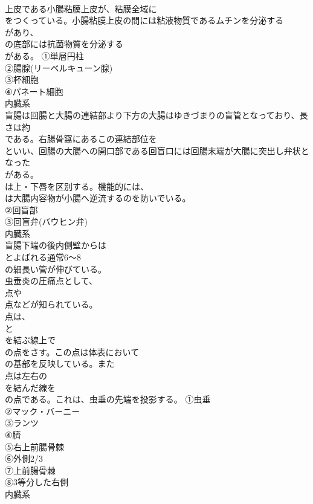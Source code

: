 \documentclass[8pt]{extreport}
\begin{document}
\begin{CJK}{UTF8}{min}
\\	上皮である小腸粘膜上皮が、粘膜全域に
\\	をつくっている。小腸粘膜上皮の間には粘液物質であるムチンを分泌する
\\	があり、
\\	の底部には抗菌物質を分泌する
\\	がある。	①単層円柱
\\	②腸腺(リーベルキューン腺)
\\	③杯細胞
\\	④パネート細胞
\\	内臓系
\\	盲腸は回腸と大腸の連結部より下方の大腸はゆきづまりの盲管となっており、長さは約
\\	である。右腸骨窩にあるこの連結部位を
\\	といい、回腸の大腸への開口部である回盲口には回腸末端が大腸に突出し弁状となった
\\	がある。
\\	は上・下唇を区別する。機能的には、
\\	は大腸内容物が小腸へ逆流するのを防いでいる。	
\\	②回盲部
\\	③回盲弁(バウヒン弁)
\\	内臓系
\\	盲腸下端の後内側壁からは
\\	とよばれる通常6～8
\\	の細長い管が伸びている。
\\	虫垂炎の圧痛点として、
\\	点や
\\	点などが知られている。
\\	点は、
\\	と
\\	を結ぶ線上で
\\	の点をさす。この点は体表において
\\	の基部を反映している。また
\\	点は左右の
\\	を結んだ線を
\\	の点である。これは、虫垂の先端を投影する。	①虫垂
\\	②マック・バーニー
\\	③ランツ
\\	④臍
\\	⑤右上前腸骨棘
\\	⑥外側2/3
\\	⑦上前腸骨棘
\\	⑧3等分した右側
\\	内臓系

\end{CJK}
\end{document}
